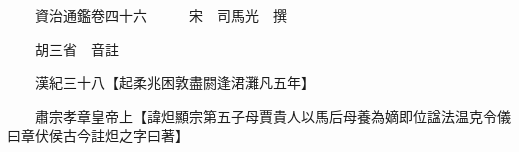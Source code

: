 










 


 
 


 

  
  
  
  
  





  
  
  
  
  
 
  

  

  
  
  



  

 
 

  
   




  

  
  


  　　資治通鑑卷四十六　　　宋　司馬光　撰

　　胡三省　音註

　　漢紀三十八【起柔兆困敦盡閼逢涒灘凡五年】

　　肅宗孝章皇帝上【諱炟顯宗第五子母賈貴人以馬后母養為嫡即位諡法温克令儀曰章伏侯古今註炟之字曰著】

